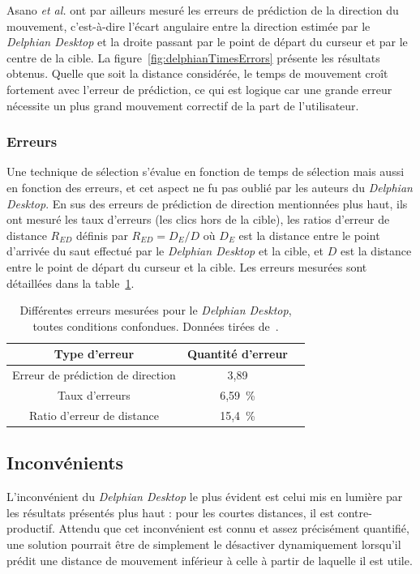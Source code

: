 	Asano \emph{et al.} ont par ailleurs mesuré les erreurs de prédiction de la direction du mouvement, c'est-à-dire l'écart angulaire entre la direction estimée par le \emph{Delphian Desktop} et la droite passant par le point de départ du curseur et par le centre de la cible. La figure~\ref{fig:delphianTimesErrors} présente les résultats obtenus. Quelle que soit la distance considérée, le temps de mouvement croît fortement avec l'erreur de prédiction, ce qui est logique car une grande erreur nécessite un plus grand mouvement correctif de la part de l'utilisateur.
	
	\subsubsection{Erreurs}
	Une technique de sélection s'évalue en fonction de temps de sélection mais aussi en fonction des erreurs, et cet aspect ne fu pas oublié par les auteurs du \emph{Delphian Desktop}. En sus des erreurs de prédiction de direction mentionnées plus haut, ils ont mesuré les taux d'erreurs (les clics hors de la cible), les ratios d'erreur de distance $R_{ED}$ définis par $R_{ED} = D_{E}/D$ où $D_{E}$ est la distance entre le point d'arrivée du \og saut \fg{} effectué par le \emph{Delphian Desktop} et la cible, et $D$ est la distance entre le point de départ du curseur et la cible. Les erreurs mesurées sont détaillées dans la table~\ref{tab:delphianErrors}.
	
	\begin{table}
	\centering
	\begin{tabular}{c | c c }
		Type d'erreur						& Quantité d'erreur	\bigstrut[b] \\ \hline
		Erreur de prédiction de direction	& 3,89\textdegree	\bigstrut[t] \\
		Taux d'erreurs						& 6,59~\%{}			\\
		Ratio d'erreur de distance			& 15,4~\%{}			\\
	\end{tabular}
	\caption[\emph{Delphian Desktop} -- erreurs]{Différentes erreurs mesurées pour le \emph{Delphian Desktop}, toutes conditions confondues. Données tirées de~\cite{asano2005predictive}.}
	\label{tab:delphianErrors}
	\end{table}
	
	\subsection{Inconvénients}
	L'inconvénient du \emph{Delphian Desktop} le plus évident est celui mis en lumière par les résultats présentés plus haut : pour les courtes distances, il est contre-productif. Attendu que cet inconvénient est connu et assez précisément quantifié, une solution pourrait être de simplement le désactiver dynamiquement lorsqu'il prédit une distance de mouvement inférieur à celle à partir de laquelle il est utile.
	
